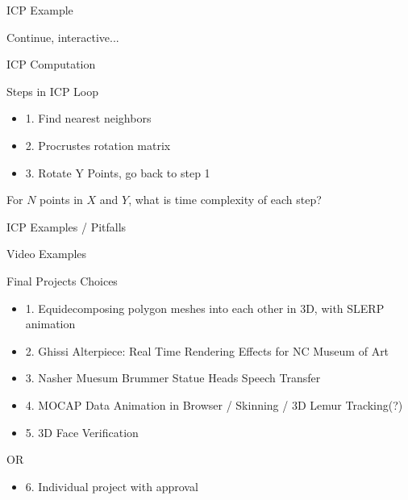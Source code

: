 \documentclass{beamer}
\begin{document}
\begin{frame}{ICP Example}

Continue, interactive...

\end{frame}


\begin{frame}{ICP Computation}

Steps in ICP Loop

\begin{itemize}

\item 1. Find nearest neighbors

\item 2. Procrustes rotation matrix

\item 3. Rotate Y Points, go back to step 1

\end{itemize}

For $N$ points in $X$ and $Y$, what is time complexity of each step?

\end{frame}


\begin{frame}{ICP Examples / Pitfalls}

Video Examples

\end{frame}

\begin{frame}{Final Projects}
Choices
\begin{itemize}
\item 1. Equidecomposing polygon meshes into each other in 3D, with SLERP animation
\item 2. Ghissi Alterpiece: Real Time Rendering Effects for NC Museum of Art
\item 3. Nasher Muesum Brummer Statue Heads Speech Transfer
\item 4. MOCAP Data Animation in Browser / Skinning / 3D Lemur Tracking(?)
\item 5. 3D Face Verification
\end{itemize}


OR

\begin{itemize}
\item 6. Individual project with approval
\end{itemize}

\end{frame}
\end{document}
